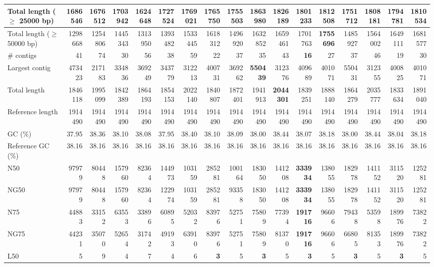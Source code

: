 \documentclass[12pt,a4paper]{article}
\begin{document}
\begin{table}[ht]
\begin{center}
\begin{tabular}{|l*{16}{|r}|}
Total length ($\geq$ 25000 bp) & 1686546 & 1676512 & 1703942 & 1624648 & 1727524 & 1769021 & 1765750 & 1755503 & {\bf 1863980} & 1826189 & 1801233 & 1812508 & 1751712 & 1808181 & 1794781 & 1810534 \\ \hline
Total length ($\geq$ 50000 bp) & 1298668 & 1254806 & 1445343 & 1313950 & 1393482 & 1533445 & 1618312 & 1496920 & 1632852 & 1659461 & 1701763 & {\bf 1755696} & 1485927 & 1564002 & 1649111 & 1681577 \\ \hline
\# contigs & 41 & 74 & 30 & 56 & 38 & 59 & 22 & 37 & 35 & 43 & {\bf 16} & 27 & 37 & 46 & 19 & 30 \\ \hline
Largest contig & 473423 & 217183 & 334836 & 369249 & 343779 & 312213 & 400731 & 369262 & {\bf 550439} & 312376 & 409689 & 401071 & 550431 & 312355 & 400825 & 401071 \\ \hline
Total length & 1846118 & 1995099 & 1842389 & 1864193 & 1854153 & 2022140 & 1840807 & 1872401 & 1941913 & {\bf 2044301} & 1839251 & 1888140 & 1864279 & 2035777 & 1833634 & 1891040 \\ \hline
Reference length & 1914490 & 1914490 & 1914490 & 1914490 & 1914490 & 1914490 & 1914490 & 1914490 & 1914490 & 1914490 & 1914490 & 1914490 & 1914490 & 1914490 & 1914490 & 1914490 \\ \hline
GC (\%) & 37.95 & 38.36 & 38.10 & 38.08 & 37.95 & 38.40 & 38.10 & 38.09 & 38.00 & 38.44 & 38.07 & 38.18 & 38.00 & 38.44 & 38.04 & 38.18 \\ \hline
Reference GC (\%) & 38.16 & 38.16 & 38.16 & 38.16 & 38.16 & 38.16 & 38.16 & 38.16 & 38.16 & 38.16 & 38.16 & 38.16 & 38.16 & 38.16 & 38.16 & 38.16 \\ \hline
N50 & 97979 & 80448 & 157960 & 82364 & 144973 & 103159 & 285281 & 100164 & 183050 & 141208 & {\bf 333934} & 138055 & 182978 & 141152 & 311520 & 125281 \\ \hline
NG50 & 97979 & 80448 & 157960 & 82364 & 122974 & 103159 & 285281 & 93358 & 183050 & 141208 & {\bf 333934} & 138055 & 182978 & 141152 & 311520 & 125281 \\ \hline
N75 & 44883 & 33152 & 63553 & 33896 & 60895 & 52032 & 83976 & 52751 & 75809 & 77394 & {\bf 191716} & 96606 & 79438 & 53598 & 189976 & 73822 \\ \hline
NG75 & 44231 & 35070 & 52654 & 31742 & 49193 & 63910 & 83976 & 52751 & 75809 & 81370 & {\bf 191716} & 96606 & 66805 & 81353 & 189976 & 73822 \\ \hline
L50 & 5 & 9 & 4 & 7 & 4 & 6 & {\bf 3} & 5 & {\bf 3} & 5 & {\bf 3} & 5 & {\bf 3} & 5 & {\bf 3} & 5 \\ \hline

\end{tabular}
\end{center}
\end{table}
\end{document}
